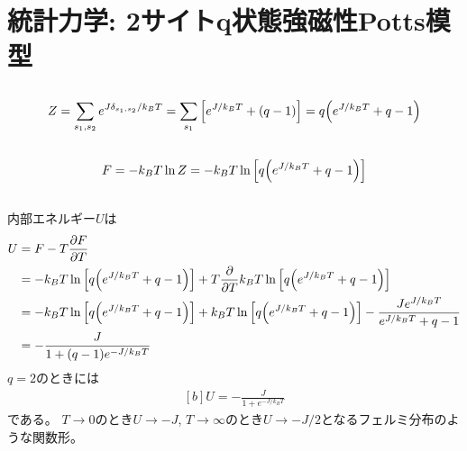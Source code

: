 \documentclass[../ap_2009.tex]{subfiles}
\begin{document}
\chapter{統計力学: 2サイトq状態強磁性Potts模型}
\section{}
\begin{equation}\begin{aligned}[b]
    Z = \sum_{s_1,s_2}e^{J\delta_{s_1,s_2}/k_BT}
    =\sum_{s_1}\qty[e^{J/k_BT}+(q-1)]
    =q\qty(e^{J/k_BT}+q-1)
\end{aligned}\end{equation}

\section{}
\begin{equation}\begin{aligned}[b]
    F = -k_BT\ln Z = -k_BT\ln\qty[q\qty(e^{J/k_BT}+q-1)]
\end{aligned}\end{equation}

\section{}
内部エネルギー\(U\)は
\begin{equation}\begin{aligned}[b]
    U &= F- T\pdv{F}{T}\\
    &=-k_BT\ln\qty[q\qty(e^{J/k_BT}+q-1)]+T\pdv{T} k_BT\ln\qty[q\qty(e^{J/k_BT}+q-1)]\\
    &=-k_BT\ln\qty[q\qty(e^{J/k_BT}+q-1)]+k_BT\ln\qty[q\qty(e^{J/k_BT}+q-1)]
        -\frac{Je^{J/k_BT}}{e^{J/k_BT}+q-1}\\
    &= -\frac{J}{1+(q-1)e^{-J/k_BT}}
\end{aligned}\end{equation}
\(q=2\)のときには
\begin{equation}\begin{aligned}[b]
    U = -\frac{J}{1+e^{-J/k_BT}}
\end{aligned}\end{equation}
である。
\(T\to0\)のとき\(U\to-J\), \(T\to\infty\)のとき\(U\to-J/2\)となるフェルミ分布のような関数形。
\end{document}
